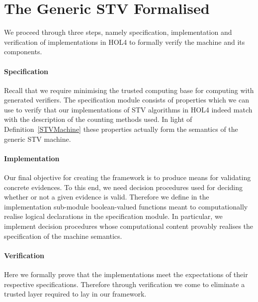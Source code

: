 \documentclass[10pt,conference]{IEEEtran}
\begin{document}
\section{The Generic STV Formalised}\label{sec:GenCertVer}
We proceed through three steps, namely specification, implementation and verification of implementations in HOL4 to formally verify the machine and its components.
\paragraph*{Specification} 
Recall that we require minimising the trusted computing base  for computing with generated verifiers. The specification module consists of properties which we can use to verify that our implementations of  STV algorithms in HOL4 indeed match with the description of the counting methods used.  
 In light of Definition~\ref{STVMachine} these properties   actually form the semantics of the generic STV machine. 
\paragraph*{Implementation} Our final objective for creating the framework is to produce means for validating concrete evidences. To this end, we need decision procedures used for deciding whether or not a given evidence is valid. Therefore we define in the implementation sub-module boolean-valued functions meant to computationally realise logical declarations in the specification module. In particular, we implement decision procedures whose computational content  provably realises the specification of the machine semantics.  
\paragraph*{Verification} Here we formally prove that the implementations meet the expectations of their respective specifications. Therefore through verification we come to eliminate a trusted layer  required to lay in our framework.  
\end{document}
